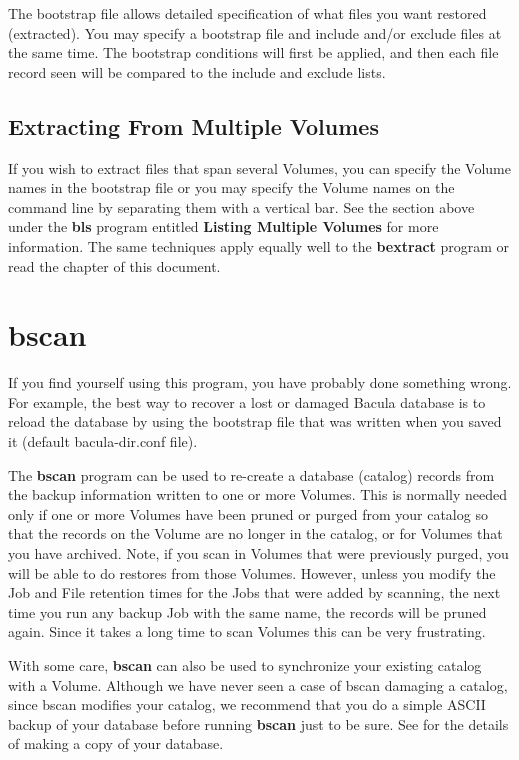 The bootstrap file allows detailed specification of what files you want
restored (extracted). You may specify a bootstrap file and include and/or
exclude files at the same time. The bootstrap conditions will first be
applied, and then each file record seen will be compared to the include and
exclude lists. 

\subsection{Extracting From Multiple Volumes}

If you wish to extract files that span several Volumes, you can specify the
Volume names in the bootstrap file or you may specify the Volume names on the
command line by separating them with a vertical bar. See the section above
under the {\bf bls} program entitled {\bf Listing Multiple Volumes} for more
information. The same techniques apply equally well to the {\bf bextract}
program or read the 
chapter of this document.

\section{bscan}
\label{bscan}

If you find yourself using this program, you have probably done something
wrong. For example, the best way to recover a lost or damaged Bacula
database is to reload the database by using the bootstrap file that
was written when you saved it (default bacula-dir.conf file).

The {\bf bscan} program can be used to re-create a database (catalog)
records from the backup information written to one or more Volumes.  This
is normally needed only if one or more Volumes have been pruned or purged
from your catalog so that the records on the Volume are no longer in the
catalog, or for Volumes that you have archived.  Note, if you scan in
Volumes that were previously purged, you will be able to do restores from
those Volumes.  However, unless you modify the Job and File retention times
for the Jobs that were added by scanning, the next time you run any backup Job
with the same name, the records will be pruned again.  Since it takes a
long time to scan Volumes this can be very frustrating.

With some care, {\bf bscan} can also be used to synchronize your existing
catalog with a Volume.  Although we have never seen a case of bscan
damaging a catalog, since bscan modifies your catalog, we recommend that
you do a simple ASCII backup of your database before running {\bf bscan}
just to be sure.  See  for
the details of making a copy of your database.

